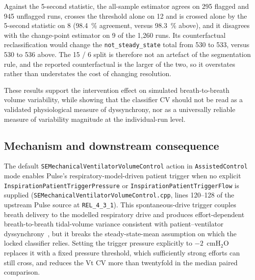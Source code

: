 \documentclass[pdflatex,sn-nature]{sn-jnl}%
\begin{document}
Against the 5-second statistic, the all-sample estimator agrees on 295 flagged and 945 unflagged runs, crosses the threshold alone on 12 and is crossed alone by the 5-second statistic on 8 (98.4~\% agreement, versus 98.3~\% above), and it disagrees with the change-point estimator on 9 of the 1{,}260 runs. Its counterfactual reclassification would change the \texttt{not\_steady\_state} total from 530 to 533, versus 530 to 536 above. The 15 / 6 split is therefore not an artefact of the segmentation rule, and the reported counterfactual is the larger of the two, so it overstates rather than understates the cost of changing resolution.

These results support the intervention effect on simulated breath-to-breath volume variability, while showing that the classifier CV should not be read as a validated physiological measure of dyssynchrony, nor as a universally reliable measure of variability magnitude at the individual-run level.

\subsection{Mechanism and downstream consequence}\label{sec:s8-mech}

The default \texttt{SEMechanicalVentilatorVolumeControl} action in \texttt{AssistedControl} mode enables Pulse's respiratory-model-driven patient trigger when no explicit \texttt{InspirationPatientTriggerPressure} or \texttt{InspirationPatientTriggerFlow} is supplied (\texttt{SEMechanicalVentilatorVolumeControl.cpp}, lines 120--128 of the upstream Pulse source at \texttt{REL\_4\_3\_1}). This spontaneous-drive trigger couples breath delivery to the modelled respiratory drive and produces effort-dependent breath-to-breath tidal-volume variance consistent with patient--ventilator dyssynchrony~\cite{figueroacasas2016}, but it breaks the steady-state-mean assumption on which the locked classifier relies. Setting the trigger pressure explicitly to $-2$~cmH$_2$O replaces it with a fixed pressure threshold, which sufficiently strong efforts can still cross, and reduces the Vt CV more than twentyfold in the median paired comparison.
\end{document}
